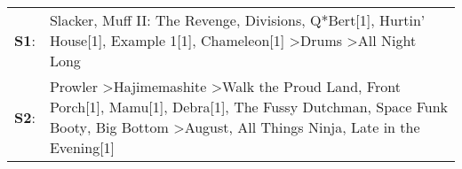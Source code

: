 \begin{supertabular}{p{0.03\textwidth}p{0.92\textwidth}}
 \textbf{S1}:  &                                                                                                                                                         Slacker\textsuperscript{}, \enspace Muff II: The Revenge\textsuperscript{}, \enspace Divisions\textsuperscript{}, \enspace Q*Bert[1]\textsuperscript{}, \enspace Hurtin' House[1]\textsuperscript{}, \enspace Example 1[1]\textsuperscript{}, \enspace Chameleon[1]\textsuperscript{} \textgreater \enspace Drums\textsuperscript{} \textgreater \enspace All Night Long\textsuperscript{}  \enspace  \\
 \textbf{S2}:  &  Prowler\textsuperscript{} \textgreater \enspace Hajimemashite\textsuperscript{} \textgreater \enspace Walk the Proud Land\textsuperscript{}, \enspace Front Porch[1]\textsuperscript{}, \enspace Mamu[1]\textsuperscript{}, \enspace Debra[1]\textsuperscript{}, \enspace The Fussy Dutchman\textsuperscript{}, \enspace Space Funk Booty\textsuperscript{}, \enspace Big Bottom\textsuperscript{} \textgreater \enspace August\textsuperscript{}, \enspace All Things Ninja\textsuperscript{}, \enspace Late in the Evening[1]\textsuperscript{}  \enspace  \\
\end{supertabular}
